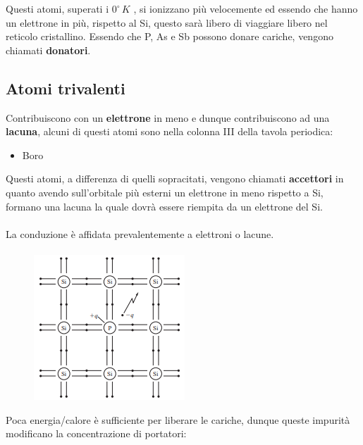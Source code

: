 Questi atomi, superati i $0^{\circ}\,K$ , si ionizzano più velocemente ed essendo che hanno un elettrone in più, rispetto al Si, questo sarà libero di viaggiare libero nel reticolo cristallino. Essendo che P, As e Sb possono donare cariche, vengono chiamati \textbf{donatori}.

\subsection{Atomi	trivalenti }
Contribuiscono con un	\textbf{elettrone}	in	meno e dunque contribuiscono ad una \textbf{lacuna}, alcuni di questi atomi sono nella colonna III della tavola periodica:
\begin{itemize}
\centering
    \item[] Boro
\end{itemize}

Questi atomi, a differenza di quelli sopracitati, vengono chiamati \textbf{accettori} in quanto avendo sull'orbitale più esterni un elettrone in meno rispetto a Si, formano una lacuna la quale dovrà essere riempita da un elettrone del Si.
\paragraph{}
La conduzione è affidata prevalentemente a elettroni o lacune.

\paragraph{}
\begin{figure}[htbp]
    \centering
    \includegraphics[width=0.35\linewidth]{img/energia_p.png}    
\end{figure}
Poca energia/calore è sufficiente per liberare le cariche, dunque queste impurità modificano la concentrazione di portatori:

